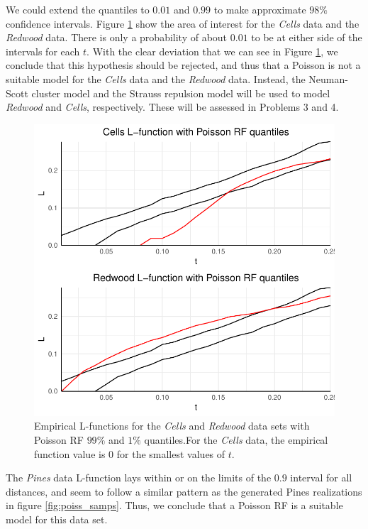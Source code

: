 We could extend the quantiles to $0.01$ and $0.99$ to make approximate $98\%$ confidence intervals. Figure \ref{fig:poiss_quantiles2} show the area of interest for the \textit{Cells} data and the \textit{Redwood} data. There is only a probability of about $0.01$ to be at either side of the intervals for each $t$. With the clear deviation that we can see in Figure \ref{fig:poiss_quantiles2}, we conclude that this hypothesis should be rejected, and thus that a Poisson is not a suitable model for the \textit{Cells} data and the \textit{Redwood} data. Instead, the Neuman-Scott cluster model and the Strauss repulsion model will be used to model \textit{Redwood} and \textit{Cells}, respectively. These will be assessed in Problems 3 and 4. 

\begin{figure}
    \centering
    \includegraphics[scale=0.9]{figures/prob1_quantiles2.pdf}
    \caption{Empirical L-functions for the \textit{Cells} and \textit{Redwood} data sets with Poisson RF $99\%$ and $1\%$ quantiles.For the \textit{Cells} data, the empirical function value is $0$ for the smallest values of $t$.}
    \label{fig:poiss_quantiles2}
\end{figure}

The \textit{Pines} data L-function lays within or on the limits of the $0.9$ interval for all distances, and seem to follow a similar pattern as the generated Pines realizations in figure \ref{fig:poiss_samps}. Thus, we conclude that a Poisson RF is a suitable model for this data set.